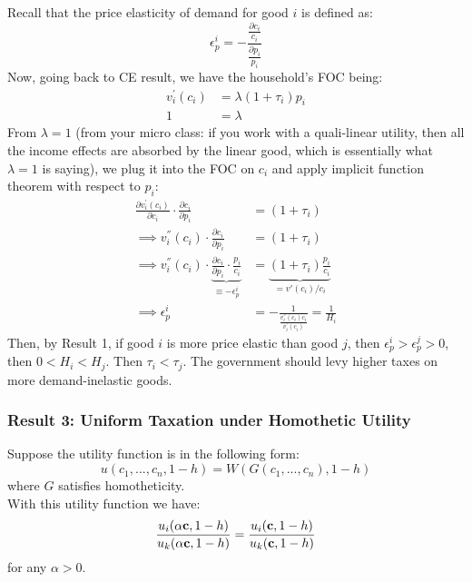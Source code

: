 \documentclass[12pt]{article}
\begin{document}
	Recall that the price elasticity of demand for good $i$ is defined as:
	\begin{equation*}
		\epsilon_p^i = -\frac{\frac{\partial c_i}{c_i}}{\frac{\partial p_i}{p_i}}
	\end{equation*}
	Now, going back to CE result, we have the household's FOC being:
	\begin{align}
		v_i^{'}(c_i) &= \lambda (1 + \tau_i)p_i\\
		1 &= \lambda
	\end{align}
	From $\lambda= 1$ (from your micro class: if you work with a quali-linear utility, then all the income effects are absorbed by the linear good, which is essentially what $\lambda = 1$ is saying), we plug it into the FOC on $c_i$ and apply implicit function theorem with respect to $p_i$:
	\begin{align*}
		\frac{\partial v_i^{'}(c_i)}{\partial c_i} \cdot \frac{\partial c_i}{\partial p_i} &= (1+\tau_i)\\
		\implies v_i^{''}(c_i) \cdot \frac{\partial c_i}{\partial p_i}   &=  (1+\tau_i) \\
		\implies v_i^{''}(c_i) \cdot \underbrace{\frac{\partial c_i}{\partial p_i} \cdot \frac{p_i}{c_i}}_{\equiv - \epsilon_p^i} &= \underbrace{(1+\tau_i) \frac{p_i}{c_i}}_{= v'(c_i)/c_i} \\
		\implies \epsilon_p^i &= -\frac{1}{\frac{v_i^{''}(c_i) c_i}{v_i^{'}(c_i)}} = \frac{1}{H_i}
	\end{align*}
	Then, by Result 1, if good $i$ is more price elastic than good $j$, then $\epsilon_p^i > \epsilon_p^j > 0$, then $0<H_i<H_j$. Then $\tau_i < \tau_j$. The government should levy higher taxes on more demand-inelastic goods.
	
	\subsubsection*{Result 3: Uniform Taxation under Homothetic Utility}
	Suppose the utility function is in the following form:
	\begin{equation*}
		u(c_1, ..., c_n, 1-h) = W(G(c_1, ..., c_n), 1-h)
	\end{equation*}
	where $G$ satisfies homotheticity.\\
	With this utility function we have:
	\begin{equation*}
		\frac{u_i(\alpha \bold{c}, 1-h)}{u_k(\alpha \bold{c}, 1-h)} = \frac{u_i( \bold{c}, 1-h)}{u_k( \bold{c}, 1-h)}
	\end{equation*}
	for any $\alpha > 0$.\\
	
\end{document}
